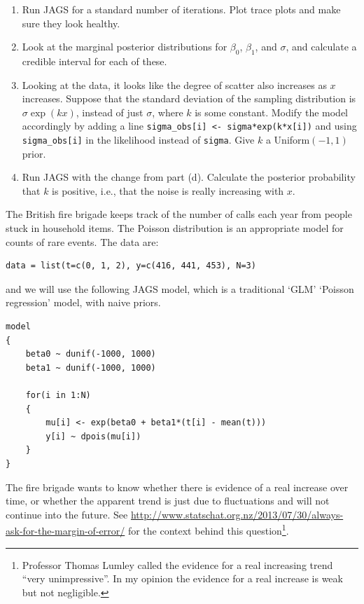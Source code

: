 \documentclass[12pt]{article}
\begin{document}
\begin{Questions}
\begin{enumerate}
\item [(b)] Run JAGS for a standard number of iterations.
                Plot trace plots and make sure they look healthy.
\item [(c)] Look at the marginal posterior distributions for
$\beta_0$, $\beta_1$, and $\sigma$, and calculate a credible interval for
each of these.
\item [(d)] Looking at the data,
                it looks like the degree
                of scatter also increases as $x$ increases. Suppose that
                the standard deviation of the sampling distribution
                is $\sigma \exp(kx)$, instead of
                just $\sigma$, where $k$ is some constant. Modify the model
                accordingly
                by adding a line
    \texttt{sigma_obs[i] <- sigma*exp(k*x[i])}
    and using \texttt{sigma_obs[i]} in the likelihood instead of
        \texttt{sigma}.
     Give $k$ a Uniform$(-1, 1)$ prior.

\item [(e)] Run JAGS with the change from part (d).
Calculate the posterior
probability that $k$ is positive, i.e., that the noise is really increasing
with $x$.
\end{enumerate}

\item
The British fire brigade keeps track of the number of
calls each year from people stuck in household items. The Poisson distribution
is an appropriate model for counts of rare events. The data are:
\begin{verbatim}
data = list(t=c(0, 1, 2), y=c(416, 441, 453), N=3)
\end{verbatim}
and we will use the following JAGS model, which is a traditional `GLM'
`Poisson regression' model, with naive priors.

\begin{verbatim}
model
{
    beta0 ~ dunif(-1000, 1000)
    beta1 ~ dunif(-1000, 1000)

    for(i in 1:N)
    {
        mu[i] <- exp(beta0 + beta1*(t[i] - mean(t)))
        y[i] ~ dpois(mu[i])
    }
}
\end{verbatim}

The fire brigade wants to know whether there is evidence of a real increase
over time, or whether the apparent trend is just due to fluctuations and will
not continue into the future. See
\url{http://www.statschat.org.nz/2013/07/30/always-ask-for-the-margin-of-error/}
for the context behind this question\footnote{Professor Thomas Lumley called the evidence
for a real increasing trend ``very unimpressive''. In my opinion the evidence for
a real increase is weak but not negligible.}.


\end{Questions}
\end{document}
